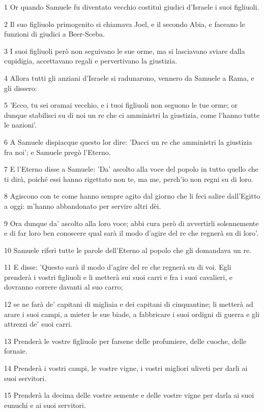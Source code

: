 \par 1 Or quando Samuele fu diventato vecchio costituì giudici d'Israele i suoi figliuoli.
\par 2 Il suo figliuolo primogenito si chiamava Joel, e il secondo Abia, e faceano le funzioni di giudici a Beer-Sceba.
\par 3 I suoi figliuoli però non seguivano le sue orme, ma si lasciavano sviare dalla cupidigia, accettavano regali e pervertivano la giustizia.
\par 4 Allora tutti gli anziani d'Israele si radunarono, vennero da Samuele a Rama, e gli dissero:
\par 5 'Ecco, tu sei oramai vecchio, e i tuoi figliuoli non seguono le tue orme; or dunque stabilisci su di noi un re che ci amministri la giustizia, come l'hanno tutte le nazioni'.
\par 6 A Samuele dispiacque questo lor dire: 'Dacci un re che amministri la giustizia fra noi'; e Samuele pregò l'Eterno.
\par 7 E l'Eterno disse a Samuele: 'Da' ascolto alla voce del popolo in tutto quello che ti dirà, poiché essi hanno rigettato non te, ma me, perch'io non regni su di loro.
\par 8 Agiscono con te come hanno sempre agito dal giorno che li feci salire dall'Egitto a oggi: m'hanno abbandonato per servire altri dèi.
\par 9 Ora dunque da' ascolto alla loro voce; abbi cura però di avvertirli solennemente e di far loro ben conoscere qual sarà il modo d'agire del re che regnerà su di loro'.
\par 10 Samuele riferì tutte le parole dell'Eterno al popolo che gli domandava un re.
\par 11 E disse: 'Questo sarà il modo d'agire del re che regnerà su di voi. Egli prenderà i vostri figliuoli e li metterà sui suoi carri e fra i suoi cavalieri, e dovranno correre davanti al suo carro;
\par 12 se ne farà de' capitani di migliaia e dei capitani di cinquantine; li metterà ad arare i suoi campi, a mieter le sue biade, a fabbricare i suoi ordigni di guerra e gli attrezzi de' suoi carri.
\par 13 Prenderà le vostre figliuole per farsene delle profumiere, delle cuoche, delle fornaie.
\par 14 Prenderà i vostri campi, le vostre vigne, i vostri migliori uliveti per darli ai suoi servitori.
\par 15 Prenderà la decima delle vostre semente e delle vostre vigne per darla ai suoi eunuchi e ai suoi servitori.
